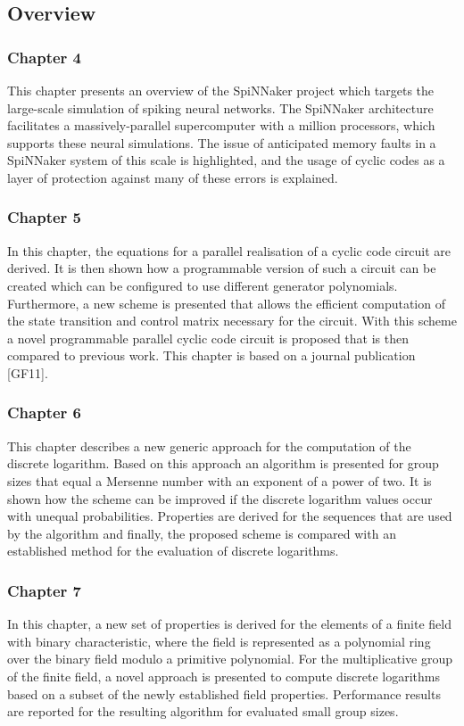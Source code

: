 \documentclass[a4paper, 11pt]{article}
\begin{document}
\subsection{Overview}
\subsubsection{Chapter 4}
This chapter presents an overview of the SpiNNaker project which targets the large-scale simulation of spiking neural networks. The SpiNNaker architecture facilitates a massively-parallel supercomputer with a million processors, which supports these neural simulations. The issue of anticipated memory faults in a SpiNNaker system of this scale is highlighted, and the usage of cyclic codes as a layer of protection against many of these errors is explained.

\subsubsection{Chapter 5}
In this chapter, the equations for a parallel realisation of a cyclic code circuit are derived. It is then shown how a programmable version of such a circuit can be created which can be configured to use different generator polynomials. Furthermore, a new scheme is presented that allows the efficient computation of the state transition and control matrix necessary for the circuit. With this scheme a novel programmable parallel cyclic code circuit is proposed that is then compared to previous work. This chapter is based on a journal publication [GF11].

\subsubsection{Chapter 6}
This chapter describes a new generic approach for the computation of the discrete logarithm. Based on this approach an algorithm is presented for group sizes that equal a Mersenne number with an exponent of a power of two. It is shown how the scheme can be improved if the discrete logarithm values occur with unequal probabilities. Properties are derived for the sequences that are used by the algorithm and finally, the proposed scheme is compared with an established method for the evaluation of discrete logarithms.

\subsubsection{Chapter 7}
In this chapter, a new set of properties is derived for the elements of a finite field with binary characteristic, where the field is represented as a polynomial ring over the binary field modulo a primitive polynomial. For the multiplicative group of the finite field, a novel approach is presented to compute discrete logarithms based on a subset of the newly established field properties. Performance results are reported for the resulting algorithm for evaluated small group sizes.
\end{document}
